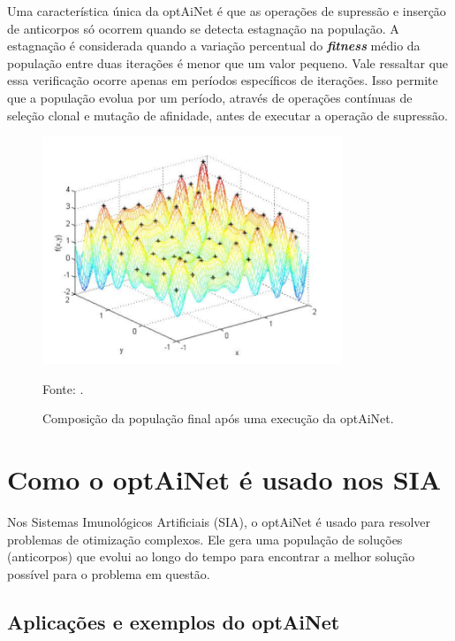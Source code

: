 Uma característica única da optAiNet é que as operações de supressão e inserção de anticorpos só ocorrem quando se detecta estagnação na população. A estagnação é considerada quando a variação percentual do \textbf{\textit{fitness}} médio da população entre duas iterações é menor que um valor pequeno. Vale ressaltar que essa verificação ocorre apenas em períodos específicos de iterações. Isso permite que a população evolua por um período, através de operações contínuas de seleção clonal e mutação de afinidade, antes de executar a operação de supressão.

\begin{figure}[h]
\centering
\includegraphics[width=0.8\textwidth]{imgs/populacao_optainet.png}
\caption{Composição da população final após uma execução da optAiNet.}
\label{fig:populacao_optainet}
Fonte: \cite{boccato2024}.
\end{figure}

\section{Como o optAiNet é usado nos SIA} \thispagestyle{mystyle}

Nos Sistemas Imunológicos Artificiais (SIA), o optAiNet é usado para resolver problemas de otimização complexos. Ele gera uma população de soluções (anticorpos) que evolui ao longo do tempo para encontrar a melhor solução possível para o problema em questão.

\subsection{Aplicações e exemplos do optAiNet} \thispagestyle{mystyle}

